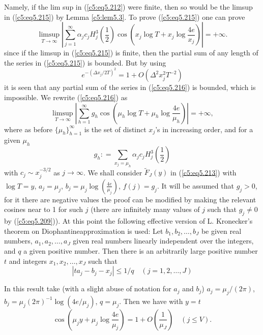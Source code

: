 Namely, if the lim sup in (\ref{c5:eq5.212}) were finite, then so
would be the limsup in (\ref{c5:eq5.215}) by Lemma \ref{c5:lem5.3}. To
prove (\ref{c5:eq5.215}) one can prove  
\begin{equation}
\limsup\limits_{T \to \infty} \left| \sum\limits^{\infty}_{j=1}
\alpha_j c_j H^3_j \left(\frac{1}{2}\right) 
\cos \left(x_j \log T + x_j \log
\frac{4e}{x_j} \right) \right| = + \infty. 
\label{c5:eq5.216}
\end{equation}
since if the limsup in (\ref{c5:eq5.215}) is finite, then the partial
sum of any length of the series in (\ref{c5:eq5.215}) is bounded. But
by using  
$$ 
e^{-(\Delta x_j/2T)^2} = 1+ O \left(\Delta^2 x^2_j T^{-2}\right)
$$
it is seen that any partial sum of the series in (\ref{c5:eq5.216}) is
bounded, which is impossible. We rewrite (\ref{c5:eq5.216}) as 
\begin{equation} 
\limsup\limits_{T \to \infty} \left| \sum\limits^\infty_{h=1} g_h \cos
\left(\mu_h \log T + \mu_h \log \frac{4e}{\mu_h} \right) \right| = +
\infty,\label{c5:eq5.217} 
\end{equation}
where as before $\{\mu_h\}^\infty_{h=1}$ is the  set of distinct
$x_j$'s in increasing order, and for a given $\mu_h$ 
$$
g_h : = \sum\limits_{x_j = \mu_h} \alpha_j c_j H^3_j \left(\frac{1}{2}
\right) 
$$
with $c_j \sim x^{-3/2}_j$ as $j \to \infty$. We shall consider
$\tilde{F}_J(y)$ in (\ref{c5:eq5.213}) with $\log T = y$, $a_j =
\mu_j$, $b_j = \mu_j \log (\frac{4e}{\mu_j})$, $f(j) = g_j$. It will
be assumed that $g_j > 0$, for it there are negative values the proof
can be modified by making the relevant cosines near to 1 for such $j$
(there are infinitely many values of $j$ such that $g_j \neq 0$ by
(\ref{c5:eq5.209})). At this point the following effective version of
L. Kronecker's theorem on Diophantine\pageoriginale approximation is
used: Let $b_1, b_2, \ldots, b_J$ be given real numbers, $a_1 , a_2,
\ldots, a_J$ given real numbers linearly independent over the
integers, and $q$ a given positive number. Then there is an
arbitrarily large positive number $t$ and integers $x_1, x_2, \ldots,
x_J$ such that  
$$
|ta_j - b_j - x_j| \leq 1/q  \quad (j = 1, 2, \ldots, J)
$$

In this result take (with a slight abuse of notation for $a_j$ and
$b_j$) $a_j = \mu_j /(2\pi)$, $b_j = \mu_j (2\pi)^{-1} \log
(4e/\mu_j)$, $q=\mu_j$. Then we have with $y=t$ 
$$ 
\cos \left(\mu_j y + \mu_j \log \frac{4e}{\mu_j} \right) = 1+ O
\left(\frac{1}{\mu_J} \right) \quad (j \leq V).  
$$


